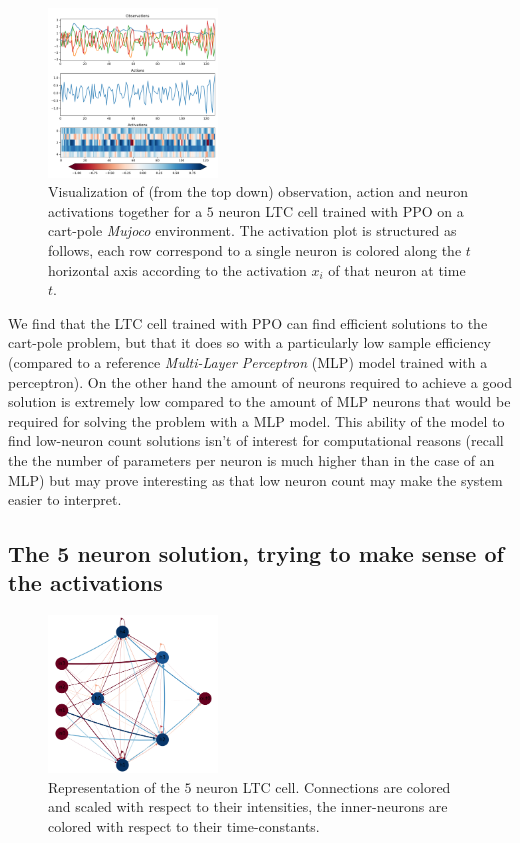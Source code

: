 \begin{figure}[h!]
    \centering
    \includegraphics[width=0.4\textwidth]{figures/5n_solution.pdf}
    \caption{Visualization of (from the top down) observation, action and neuron activations together for a $5$ neuron LTC cell trained with PPO on a cart-pole \textit{Mujoco} environment. The activation plot is structured as follows, each row correspond to a single neuron is colored along the $t$ horizontal axis according to the activation $x_i$ of that neuron at time $t$.}
    \label{fig:5n_episode}
\end{figure}

We find that the LTC cell trained with PPO can find efficient solutions to the cart-pole problem, but that it does so with a particularly low sample efficiency (compared to a reference \textit{Multi-Layer Perceptron} ({MLP}) model trained with a perceptron). On the other hand the amount of neurons required to achieve a good solution is extremely low compared to the amount of MLP neurons that would be required for solving the problem with a {MLP} model. This ability of the model to find low-neuron count solutions isn't of interest for computational reasons (recall the the number of parameters per neuron is much higher than in the case of an MLP) but may prove interesting as that low neuron count may make the system easier to interpret. 

\subsection{The 5 neuron solution, trying to make sense of the activations}
\label{sec:5-neurons}

\begin{figure}[h!]
    \centering
    \includegraphics[width=0.4\textwidth]{figures/5n_schematic.png}
    \caption{Representation of the $5$ neuron LTC cell. Connections are colored and scaled with respect to their intensities, the inner-neurons are colored with respect to their time-constants.}
    \label{fig:5n_schematic}
\end{figure}

